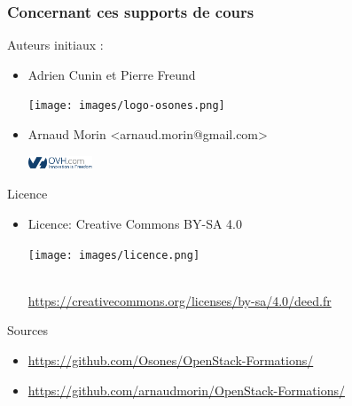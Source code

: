   \begin{frame}
    \frametitle{Concernant ces supports de cours}
    Auteurs initiaux :
    \begin{itemize}
      \item Adrien Cunin et Pierre Freund
        \begin{minipage}[c]{1.5cm}
          \texttt{[image: images/logo-osones.png]}
        \end{minipage}
      \item Arnaud Morin \textless arnaud.morin@gmail.com\textgreater
        \begin{minipage}[c]{1.5cm}
          \includegraphics[height=0.4cm]{images/logo-ovh-avec-300DPI.png}
        \end{minipage}
    \end{itemize}
    
    \vspace{0.3cm}
    Licence
    \begin{itemize}
      \item Licence: Creative Commons BY-SA 4.0 
        \begin{minipage}[c]{3cm}
          \texttt{[image: images/licence.png]} 
        \end{minipage}\\
        \url{https://creativecommons.org/licenses/by-sa/4.0/deed.fr}
    \end{itemize}
    
    \vspace{0.3cm}
    Sources
    \begin{itemize}
      \item \url{https://github.com/Osones/OpenStack-Formations/}
      \item \url{https://github.com/arnaudmorin/OpenStack-Formations/}
    \end{itemize}
  \end{frame}


